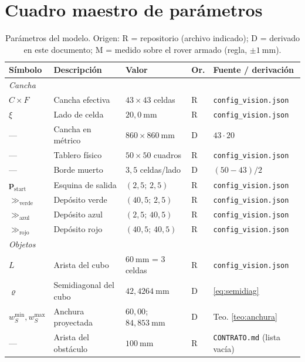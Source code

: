 \documentclass[11pt,a4paper]{article}
\theoremstyle{definition}
\newcommand{\pp}{\mathbf{p}}
\begin{document}
\section{Cuadro maestro de parámetros}
\label{sec:parametros}

\begin{table}[htbp]
\centering
\small
\caption{Parámetros del modelo. Origen: R = repositorio (archivo indicado);
D = derivado en este documento; M = medido sobre el rover armado (regla, $\pm1\ \mathrm{mm}$).}
\begin{tabular}{llllp{4.2cm}}
\toprule
Símbolo & Descripción & Valor & Or. & Fuente / derivación \\
\midrule
\multicolumn{5}{l}{\textit{Cancha}}\\
$C\times F$ & Cancha efectiva & $43\times43$ celdas & R & \texttt{config\_vision.json} \\
$\xi$ & Lado de celda & $20{,}0\ \mathrm{mm}$ & R & \texttt{config\_vision.json} \\
--- & Cancha en métrico & $860\times860\ \mathrm{mm}$ & D & $43\cdot20$ \\
--- & Tablero físico & $50\times50$ cuadros & R & \texttt{config\_vision.json} \\
--- & Borde muerto & $3{,}5$ celdas/lado & D & $(50-43)/2$ \\
$\pp_{\mathrm{start}}$ & Esquina de salida & $(2{,}5;\,2{,}5)$ & R & \texttt{config\_vision.json} \\
$\gg_{\mathrm{verde}}$ & Depósito verde & $(40{,}5;\,2{,}5)$ & R & \texttt{config\_vision.json} \\
$\gg_{\mathrm{azul}}$ & Depósito azul & $(2{,}5;\,40{,}5)$ & R & \texttt{config\_vision.json} \\
$\gg_{\mathrm{rojo}}$ & Depósito rojo & $(40{,}5;\,40{,}5)$ & R & \texttt{config\_vision.json} \\
\midrule
\multicolumn{5}{l}{\textit{Objetos}}\\
$L$ & Arista del cubo & $60\ \mathrm{mm}$ = $3$ celdas & R & \texttt{config\_vision.json} \\
$\varrho$ & Semidiagonal del cubo & $42{,}4264\ \mathrm{mm}$ & D & \eqref{eq:semidiag} \\
$w_S^{\min}, w_S^{\max}$ & Anchura proyectada & $60{,}00$; $84{,}853\ \mathrm{mm}$ & D & Teo. \ref{teo:anchura} \\
--- & Arista del obstáculo & $100\ \mathrm{mm}$ & R & \texttt{CONTRATO.md} (lista vacía) \\

\end{tabular}
\end{table}
\end{document}
